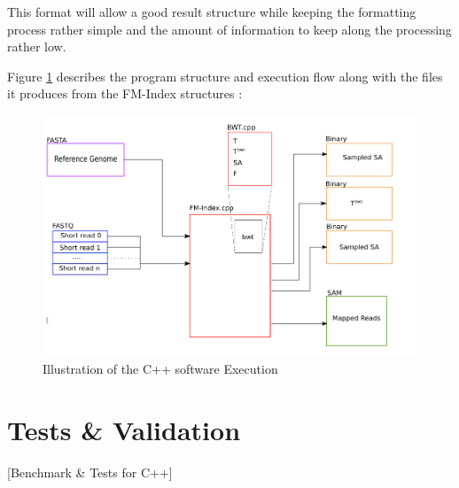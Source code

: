 This format will allow a good result structure while keeping the formatting process rather simple and the amount of information to keep along the processing rather low. 

Figure \ref{fig:cpp_workflow} describes the program structure and execution flow along with the files it produces from the FM-Index structures :

\begin{figure}[H]
    \centering
    \includegraphics[scale = 0.3]{Figures/cpp_workflow.png}
    \caption{Illustration of the C++ software Execution}
    \label{fig:cpp_workflow}
\end{figure}



\section{Tests \& Validation}

[Benchmark \& Tests for C++]